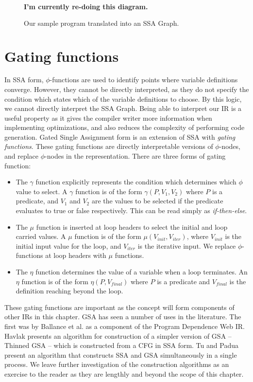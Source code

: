 \begin{figure}
\centering
\textbf{\huge I'm currently re-doing this diagram.}
\label{fig: ssa-graph-example-graph}
\caption{Our sample program translated into an SSA Graph.}
\end{figure}

\section{Gating functions}

In SSA form, $\phi$-functions are used to identify points where variable definitions converge. However, they cannot be directly interpreted, as they do not specify the condition which states which of the variable definitions to choose. By this logic, we cannot directly interpret the SSA Graph. Being able to interpret our IR is a useful property as it gives the compiler writer more information when implementing optimizations, and also reduces the complexity of performing code generation. Gated Single Assignment form  is an extension of SSA with \textit{gating functions}. These gating functions are directly interpretable versions of $\phi$-nodes, and replace $\phi$-nodes in the representation. There are three forms of gating function:

\begin{itemize}
\item The $\gamma$ function explicitly represents the condition which determines which $\phi$ value to select. A $\gamma$ function is of the form $\gamma(P,V_{1},V_{2})$ where $P$ is a predicate, and $V_{1}$ and $V_{2}$ are the values to be selected if the predicate evaluates to true or false respectively. This can be read simply as \textit{if-then-else}. 
\item The $\mu$ function is inserted at loop headers to select the initial and loop carried values. A $\mu$ function is of the form $\mu(V_{init},V_{iter})$, where $V_{init}$ is the initial input value for the loop, and $V_{iter}$ is the iterative input. We replace $\phi$-functions at loop headers with $\mu$ functions.
\item The $\eta$ function determines the value of a variable when a loop terminates. An $\eta$ function is of the form $\eta(P,V_{final})$ where $P$ is a predicate and $V_{final}$ is the definition reaching beyond the loop.
\end{itemize}

These gating functions are important as the concept will form components of other IRs in this chapter. GSA has seen a number of uses in the literature. The first was by Ballance et al. \cite{93578} as a component of the Program Dependence Web IR. Havlak \cite{Havlak93constructionof} presents an algorithm for construction of a simpler version of GSA -- Thinned GSA -- which is constructed from a CFG in SSA form. Tu and Padua \cite{207115} present an algorithm that constructs SSA and GSA simultaneously in a single process. We leave further investigation of the construction algorithms as an exercise to the reader as they are lengthly and beyond the scope of this chapter. 

